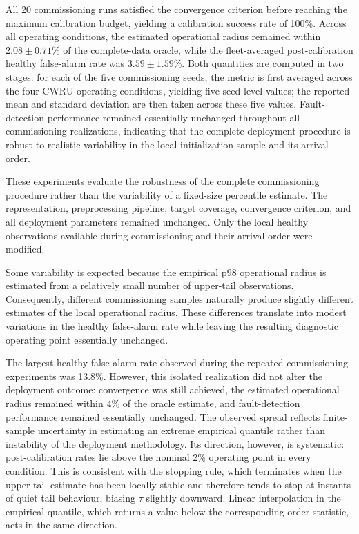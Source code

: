 \documentclass[numbered]{trbunofficial}
\begin{document}
All 20 commissioning runs satisfied the convergence criterion before
reaching the maximum calibration budget, yielding a calibration success
rate of 100\%. Across all operating conditions, the estimated operational
radius remained within $2.08 \pm 0.71$\% of the complete-data oracle, while
the fleet-averaged post-calibration healthy false-alarm rate was
$3.59 \pm 1.59$\%. Both quantities are computed in two stages: for each of
the five commissioning seeds, the metric is first averaged across the four
CWRU operating conditions, yielding five seed-level values; the reported
mean and standard deviation are then taken across these five values.
Fault-detection performance remained essentially unchanged throughout all
commissioning realizations, indicating that the complete deployment
procedure is robust to realistic variability in the local initialization
sample and its arrival order.

These experiments evaluate the robustness of the complete commissioning
procedure rather than the variability of a fixed-size percentile estimate.
The representation, preprocessing pipeline, target coverage, convergence
criterion, and all deployment parameters remained unchanged. Only the local
healthy observations available during commissioning and their arrival order
were modified.

Some variability is expected because the empirical p98 operational radius is
estimated from a relatively small number of upper-tail observations.
Consequently, different commissioning samples naturally produce slightly
different estimates of the local operational radius. These differences
translate into modest variations in the healthy false-alarm rate while
leaving the resulting diagnostic operating point essentially unchanged.

The largest healthy false-alarm rate observed during the repeated
commissioning experiments was 13.8\%. However, this isolated realization did
not alter the deployment outcome: convergence was still achieved, the
estimated operational radius remained within 4\% of the oracle estimate,
and fault-detection performance remained essentially unchanged.
The observed spread reflects finite-sample uncertainty in estimating an extreme
empirical quantile rather than instability of the deployment methodology. Its
direction, however, is systematic: post-calibration rates lie above the nominal
2\% operating point in every condition. This is consistent with the stopping
rule, which terminates when the upper-tail estimate has been locally stable and
therefore tends to stop at instants of quiet tail behaviour, biasing $\tau$
slightly downward. Linear interpolation in the empirical quantile, which
returns a value below the corresponding order statistic, acts in the same
direction.
\end{document}
